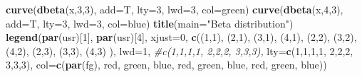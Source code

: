 \documentclass[
]{book}
\newenvironment{Shaded}{\begin{snugshade}}{\end{snugshade}}
\newcommand{\CommentTok}[1]{\textcolor[rgb]{0.56,0.35,0.01}{\textit{#1}}}
\newcommand{\DataTypeTok}[1]{\textcolor[rgb]{0.13,0.29,0.53}{#1}}
\newcommand{\DecValTok}[1]{\textcolor[rgb]{0.00,0.00,0.81}{#1}}
\newcommand{\KeywordTok}[1]{\textcolor[rgb]{0.13,0.29,0.53}{\textbf{#1}}}
\newcommand{\NormalTok}[1]{#1}
\newcommand{\StringTok}[1]{\textcolor[rgb]{0.31,0.60,0.02}{#1}}
\begin{document}
\begin{Shaded}
\begin{Highlighting}[]
\KeywordTok{curve}\NormalTok{(}\KeywordTok{dbeta}\NormalTok{(x,}\DecValTok{3}\NormalTok{,}\DecValTok{3}\NormalTok{), }\DataTypeTok{add=}\NormalTok{T, }\DataTypeTok{lty=}\DecValTok{3}\NormalTok{, }\DataTypeTok{lwd=}\DecValTok{3}\NormalTok{, }\DataTypeTok{col=}\StringTok{\textquotesingle{}green\textquotesingle{}}\NormalTok{)}
\KeywordTok{curve}\NormalTok{(}\KeywordTok{dbeta}\NormalTok{(x,}\DecValTok{4}\NormalTok{,}\DecValTok{3}\NormalTok{), }\DataTypeTok{add=}\NormalTok{T, }\DataTypeTok{lty=}\DecValTok{3}\NormalTok{, }\DataTypeTok{lwd=}\DecValTok{3}\NormalTok{, }\DataTypeTok{col=}\StringTok{\textquotesingle{}blue\textquotesingle{}}\NormalTok{)}
\KeywordTok{title}\NormalTok{(}\DataTypeTok{main=}\StringTok{"Beta distribution"}\NormalTok{)}
\KeywordTok{legend}\NormalTok{(}\KeywordTok{par}\NormalTok{(}\StringTok{\textquotesingle{}usr\textquotesingle{}}\NormalTok{)[}\DecValTok{1}\NormalTok{], }\KeywordTok{par}\NormalTok{(}\StringTok{\textquotesingle{}usr\textquotesingle{}}\NormalTok{)[}\DecValTok{4}\NormalTok{], }\DataTypeTok{xjust=}\DecValTok{0}\NormalTok{,}
       \KeywordTok{c}\NormalTok{(}\StringTok{\textquotesingle{}(1,1)\textquotesingle{}}\NormalTok{, }\StringTok{\textquotesingle{}(2,1)\textquotesingle{}}\NormalTok{, }\StringTok{\textquotesingle{}(3,1)\textquotesingle{}}\NormalTok{, }\StringTok{\textquotesingle{}(4,1)\textquotesingle{}}\NormalTok{, }
         \StringTok{\textquotesingle{}(2,2)\textquotesingle{}}\NormalTok{, }\StringTok{\textquotesingle{}(3,2)\textquotesingle{}}\NormalTok{, }\StringTok{\textquotesingle{}(4,2)\textquotesingle{}}\NormalTok{,}
         \StringTok{\textquotesingle{}(2,3)\textquotesingle{}}\NormalTok{, }\StringTok{\textquotesingle{}(3,3)\textquotesingle{}}\NormalTok{, }\StringTok{\textquotesingle{}(4,3)\textquotesingle{}}\NormalTok{ ),}
       \DataTypeTok{lwd=}\DecValTok{1}\NormalTok{, }\CommentTok{\#c(1,1,1,1, 2,2,2, 3,3,3),}
       \DataTypeTok{lty=}\KeywordTok{c}\NormalTok{(}\DecValTok{1}\NormalTok{,}\DecValTok{1}\NormalTok{,}\DecValTok{1}\NormalTok{,}\DecValTok{1}\NormalTok{, }\DecValTok{2}\NormalTok{,}\DecValTok{2}\NormalTok{,}\DecValTok{2}\NormalTok{, }\DecValTok{3}\NormalTok{,}\DecValTok{3}\NormalTok{,}\DecValTok{3}\NormalTok{),}
       \DataTypeTok{col=}\KeywordTok{c}\NormalTok{(}\KeywordTok{par}\NormalTok{(}\StringTok{\textquotesingle{}fg\textquotesingle{}}\NormalTok{), }\StringTok{\textquotesingle{}red\textquotesingle{}}\NormalTok{, }\StringTok{\textquotesingle{}green\textquotesingle{}}\NormalTok{, }\StringTok{\textquotesingle{}blue\textquotesingle{}}\NormalTok{, }
         \StringTok{\textquotesingle{}red\textquotesingle{}}\NormalTok{, }\StringTok{\textquotesingle{}green\textquotesingle{}}\NormalTok{, }\StringTok{\textquotesingle{}blue\textquotesingle{}}\NormalTok{, }\StringTok{\textquotesingle{}red\textquotesingle{}}\NormalTok{, }\StringTok{\textquotesingle{}green\textquotesingle{}}\NormalTok{, }\StringTok{\textquotesingle{}blue\textquotesingle{}}\NormalTok{))}
\end{Highlighting}
\end{Shaded}
\end{document}
